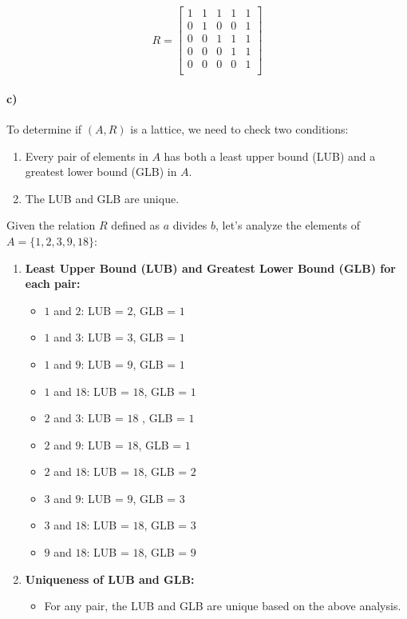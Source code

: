 \documentclass[12pt]{article}
\begin{document}
\[
R = \begin{bmatrix}
1 & 1 & 1 & 1 & 1 \\
0 & 1 & 0 & 0 & 1 \\
0 & 0 & 1 & 1 & 1 \\
0 & 0 & 0 & 1 & 1 \\
0 & 0 & 0 & 0 & 1 \\
\end{bmatrix}
\]

\paragraph{c)}

To determine if \( (A, R) \) is a lattice, we need to check two conditions:

\begin{enumerate}
    \item Every pair of elements in \( A \) has both a least upper bound (LUB) and a greatest lower bound (GLB) in \( A \).
    \item The LUB and GLB are unique.
\end{enumerate}

Given the relation \( R \) defined as \( a \) divides \( b \), let's analyze the elements of \( A = \{1, 2, 3, 9, 18\} \):

\begin{enumerate}
    \item \textbf{Least Upper Bound (LUB) and Greatest Lower Bound (GLB) for each pair:}
    \begin{itemize}
        \item \( 1 \) and \( 2 \): LUB = \( 2 \), GLB = \( 1 \)
        \item \( 1 \) and \( 3 \): LUB = \( 3 \), GLB = \( 1 \)
        \item \( 1 \) and \( 9 \): LUB = \( 9 \), GLB = \( 1 \)
        \item \( 1 \) and \( 18 \): LUB = \( 18 \), GLB = \( 1 \)
        \item \( 2 \) and \( 3 \): LUB = \( 18 \) , GLB = \( 1 \)
        \item \( 2 \) and \( 9 \): LUB = \( 18 \), GLB = \( 1 \)
        \item \( 2 \) and \( 18 \): LUB = \( 18 \), GLB = \( 2 \)
        \item \( 3 \) and \( 9 \): LUB = \( 9 \), GLB = \( 3 \)
        \item \( 3 \) and \( 18 \): LUB = \( 18 \), GLB = \( 3 \)
        \item \( 9 \) and \( 18 \): LUB = \( 18 \), GLB = \( 9 \)
    \end{itemize}
    \item \textbf{Uniqueness of LUB and GLB:}
    \begin{itemize}
        \item For any pair, the LUB and GLB are unique based on the above analysis.
    \end{itemize}
\end{enumerate}
\end{document}
